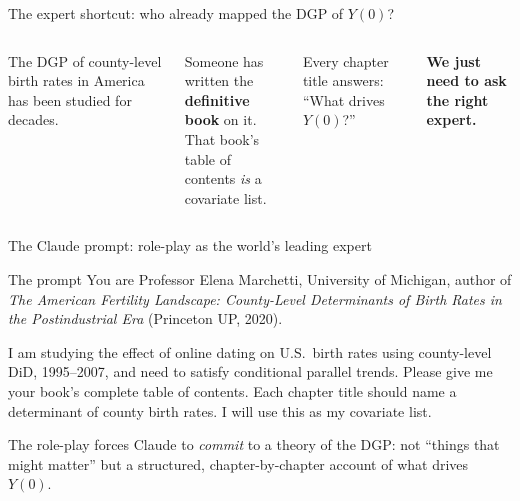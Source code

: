 \documentclass[aspectratio=169,12pt]{beamer}
\begin{document}
\begin{frame}{The expert shortcut: who already mapped the DGP of $Y(0)$?}

\vspace{0.4em}
\begin{columns}[c]
  The DGP of county-level birth rates in America has been studied for decades.

  \vspace{0.6em}
  Someone has written the \textbf{definitive book} on it.\\
  That book's table of contents \emph{is} a covariate list.

  \vspace{0.6em}
  Every chapter title answers: ``What drives $Y(0)$?''

  \vspace{0.6em}
  {\color{Terracotta}\bfseries
  We just need to ask the right expert.}

\end{columns}

\end{frame}

\begin{frame}{The Claude prompt: role-play as the world's leading expert}

\begin{exampleblock}{The prompt}
\footnotesize\ttfamily
You are Professor Elena Marchetti, University of Michigan, author of
\emph{The American Fertility Landscape: County-Level Determinants of
Birth Rates in the Postindustrial Era} (Princeton UP, 2020).

\smallskip
I am studying the effect of online dating on U.S.\ birth rates using
county-level DiD, 1995--2007, and need to satisfy conditional parallel
trends. Please give me your book's complete table of contents. Each
chapter title should name a determinant of county birth rates. I will
use this as my covariate list.
\end{exampleblock}

\vspace{0.3em}
{\small\color{OldMortar}
The role-play forces Claude to \emph{commit} to a theory of the DGP:
not ``things that might matter'' but a structured, chapter-by-chapter
account of what drives $Y(0)$.}

\end{frame}
\end{document}
